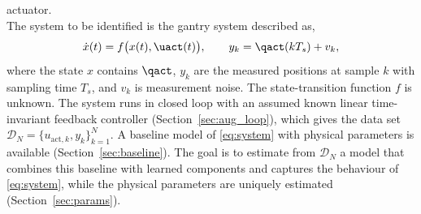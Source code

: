 actuator.
\\
The system to be identified is the gantry system
described as,
\begin{equation}
  \dot x(t)=f\bigl(x(t),\uact(t)\bigr),\qquad y_k=\qact(kT_s)+v_k,
  \label{eq:system}
\end{equation}
where the state $x$ contains $\qact$, $y_k$ are the measured positions at
sample $k$ with sampling time $T_s$, and $v_k$ is measurement noise.
The state-transition function $f$ is unknown.
The system runs in closed loop with an assumed known
linear time-invariant feedback controller (Section~\ref{sec:aug_loop}),
which gives the data set $\mathcal D_N=\{u_{\mathrm{act},k},y_k\}_{k=1}^N$.
A baseline model of \eqref{eq:system} with physical
parameters is available (Section~\ref{sec:baseline}).
The goal is to estimate from $\mathcal D_N$ a model that combines this
baseline with learned components and captures the behaviour of
\eqref{eq:system}, while the physical
parameters are uniquely estimated (Section~\ref{sec:params}).

